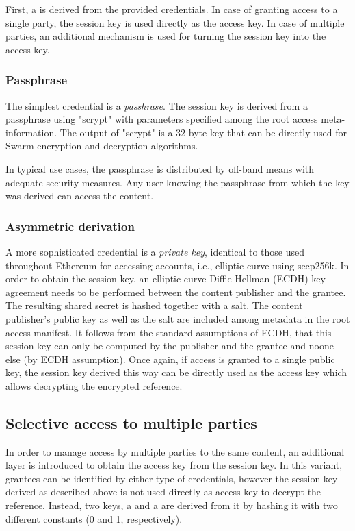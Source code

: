 First, a  is derived from the provided credentials. In case of granting access to a single party, the session key is used directly as the access key. In case of multiple parties, an additional mechanism is used for turning the session key into the access key.

\subsubsection{Passphrase}
The simplest credential is a \emph{passhrase}. The session key is derived from a passphrase using "scrypt" with parameters specified among the root access meta-information. The output of "scrypt" is a 32-byte key that can be directly used for Swarm encryption and decryption algorithms.

In typical use cases, the passphrase is distributed by off-band means with adequate security measures. Any user knowing the passphrase from which the key was derived can access the content.

\subsubsection{Asymmetric derivation}

A more sophisticated credential is a \emph{private key}, identical to those used throughout Ethereum for accessing accounts, i.e., elliptic curve using secp256k. In order to obtain the session key, an elliptic curve Diffie-Hellman (ECDH) key agreement needs to be performed between the content publisher and the grantee. The resulting shared secret is hashed together with a salt. The content publisher's public key as well as the salt are included among metadata in the root access manifest. It follows from the standard assumptions of ECDH, that this session key can only be computed by the publisher and the grantee and noone else (by ECDH assumption). 
Once again, if access is granted to a single public key, the session key derived this way can be directly used as the access key which allows decrypting the encrypted reference. 

\subsection{Selective access to multiple parties}

In order to manage access by multiple parties to the same content, an additional layer is introduced to obtain the access key from the session key. In this variant, grantees can be identified by either type of credentials, however the session key derived as
described above is not used directly as access key to decrypt the reference. Instead, two keys, a  and a  are derived from it by hashing it with two different constants (0 and 1, respectively).

